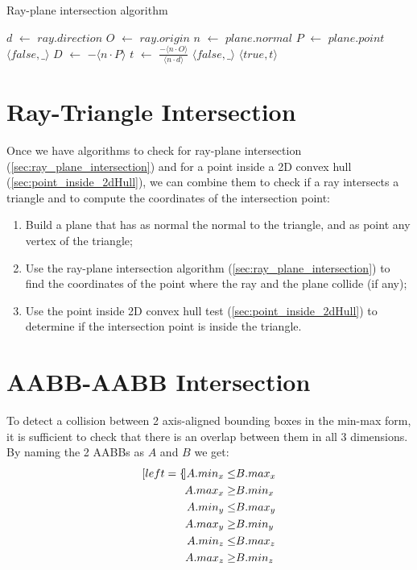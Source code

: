 \documentclass{PoliMi_MasterThesis}
\newcommand*\Let[2]{\State #1 $\gets$ #2}
\begin{document}
\begin{algorithm}[H]
	\caption{Ray-plane intersection algorithm}
	\begin{algorithmic}[1]
		\Let{$d$}{$ray.direction$}
		\Let{$O$}{$ray.origin$}
		\Let{$n$}{$plane.normal$}
		\Let{$P$}{$plane.point$}
		 
			\State \Return $\langle false, \_ \rangle$
		\EndIf
		\Let{$D$}{$-\langle n\cdot P \rangle$}
		\Let{$t$}{$\frac{-\langle n\cdot O \rangle}{\langle n\cdot d \rangle}$}
		 
			\State \Return $\langle false, \_ \rangle$
		\Else
			\State \Return $\langle true, t \rangle$
		\EndIf
		\EndFunction
	\end{algorithmic}
\end{algorithm} 

\section{Ray-Triangle Intersection} \label{sec:ray_triangle_intersection}
Once we have algorithms to check for ray-plane intersection (\ref{sec:ray_plane_intersection}) and for a point inside a 2D convex hull (\ref{sec:point_inside_2dHull}), we can combine them to check if a ray intersects a triangle and to compute the coordinates of the intersection point:

\begin{enumerate}
	\item Build a plane that has as normal the normal to the triangle, and as point any vertex of the triangle;
	\item Use the ray-plane intersection algorithm (\ref{sec:ray_plane_intersection}) to find the coordinates of the point where the ray and the plane collide (if any);
	\item Use the point inside 2D convex hull test (\ref{sec:point_inside_2dHull}) to determine if the intersection point is inside the triangle.
\end{enumerate}

\section{AABB-AABB Intersection} \label{sec:aabb_aabb_intersection}
To detect a collision between 2 axis-aligned bounding boxes in the min-max form, it is sufficient to check that there is an overlap between them in all 3 dimensions. By naming the 2 AABBs as $A$ and $B$ we get:
\begin{subequations}
	\begin{align*}[left=\empheqlbrace]
		A.min_x \leq& B.max_x \\
		A.max_x \geq& B.min_x \\
		A.min_y \leq& B.max_y \\
		A.max_y \geq& B.min_y \\
		A.min_z \leq& B.max_z \\
		A.max_z \geq& B.min_z
	\end{align*}
\end{subequations}
\end{document}

